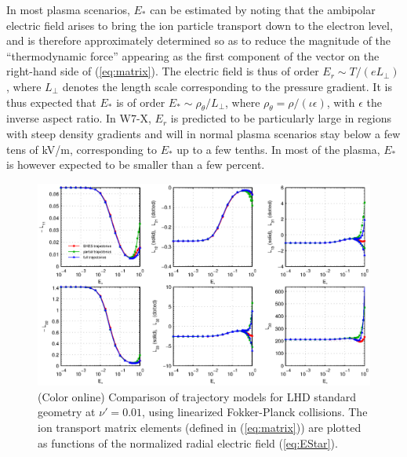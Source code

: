 \documentclass[12pt,superscriptaddress]{revtex4}
\begin{document}
In most plasma scenarios, $E_*$ can be estimated by noting that the
ambipolar electric field arises to bring the ion particle transport
down to the electron level, and is therefore approximately determined so 
as to reduce the magnitude of the ``thermodynamic
force'' appearing as the first component of the vector on the
right-hand side of (\ref{eq:matrix}). The electric field is thus of
order $E_r \sim T/(eL_\perp)$, where $L_\perp$ denotes the length
scale corresponding to the pressure gradient. It is thus expected that $E_*$
is of order $E_* \sim \rho_\theta / L_\perp$, where $\rho_{\theta} =
\rho / (\iota \epsilon)$, with $\epsilon$ the inverse aspect ratio. In
W7-X, $E_r$ is predicted to be particularly large in regions with
steep density gradients and will in normal plasma scenarios stay below
a few tens of kV/m, corresponding to $E_*$ up to a few tenths\cite{Turkin}.
In most of the plasma, $E_*$ is however expected to be smaller than a few percent.




\begin{figure}[h!]
\includegraphics{m20131202_01_plotSFINCSErComparisonForPaper_LHD.eps}
\caption{(Color online) Comparison of trajectory models for LHD standard geometry at $\nu' = 0.01$,
using linearized Fokker-Planck collisions.
The ion transport matrix elements (defined in (\ref{eq:matrix})) are plotted as functions
of the normalized radial electric field (\ref{eq:EStar}).
\label{fig:ErComparison_LHD}}
\end{figure}
\end{document}
